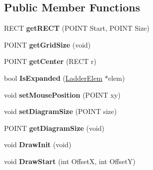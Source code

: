 \subsection*{Public Member Functions}
\begin{DoxyCompactItemize}
\item 
\hypertarget{class_ladder_g_u_i_a0b0c55332cf4f1ebfbe5b87fda50a3bc}{R\-E\-C\-T {\bfseries get\-R\-E\-C\-T} (P\-O\-I\-N\-T Start, P\-O\-I\-N\-T Size)}\label{class_ladder_g_u_i_a0b0c55332cf4f1ebfbe5b87fda50a3bc}

\item 
\hypertarget{class_ladder_g_u_i_a8426c5bd79550bcf490a0ce29a66fd4d}{P\-O\-I\-N\-T {\bfseries get\-Grid\-Size} (void)}\label{class_ladder_g_u_i_a8426c5bd79550bcf490a0ce29a66fd4d}

\item 
\hypertarget{class_ladder_g_u_i_a2e604e47d26e0897791c3b9c682f51e5}{P\-O\-I\-N\-T {\bfseries get\-Center} (R\-E\-C\-T r)}\label{class_ladder_g_u_i_a2e604e47d26e0897791c3b9c682f51e5}

\item 
\hypertarget{class_ladder_g_u_i_ae1b37dcde73b507f8536fecd271557ba}{bool {\bfseries Is\-Expanded} (\hyperlink{class_ladder_elem}{Ladder\-Elem} $\ast$elem)}\label{class_ladder_g_u_i_ae1b37dcde73b507f8536fecd271557ba}

\item 
\hypertarget{class_ladder_g_u_i_a4510c9be8e36838cc79460a37c35f5bf}{void {\bfseries set\-Mouse\-Position} (P\-O\-I\-N\-T xy)}\label{class_ladder_g_u_i_a4510c9be8e36838cc79460a37c35f5bf}

\item 
\hypertarget{class_ladder_g_u_i_a41d24a0adc071b4bd2b020f53f6452f3}{void {\bfseries set\-Diagram\-Size} (P\-O\-I\-N\-T size)}\label{class_ladder_g_u_i_a41d24a0adc071b4bd2b020f53f6452f3}

\item 
\hypertarget{class_ladder_g_u_i_ae44faaf1fc7153aa0859c001d1293c60}{P\-O\-I\-N\-T {\bfseries get\-Diagram\-Size} (void)}\label{class_ladder_g_u_i_ae44faaf1fc7153aa0859c001d1293c60}

\item 
\hypertarget{class_ladder_g_u_i_adaddaa4612d67211fc6c8ba7f76c2ae4}{void {\bfseries Draw\-Init} (void)}\label{class_ladder_g_u_i_adaddaa4612d67211fc6c8ba7f76c2ae4}

\item 
\hypertarget{class_ladder_g_u_i_aac5fdbae15dc7d7fa4f222470e9146f2}{void {\bfseries Draw\-Start} (int Offset\-X, int Offset\-Y)}\label{class_ladder_g_u_i_aac5fdbae15dc7d7fa4f222470e9146f2}


\end{DoxyCompactItemize}
